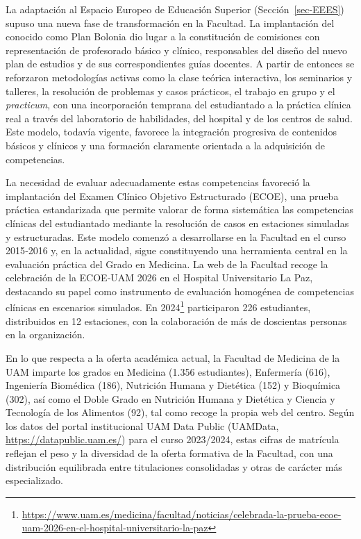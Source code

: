 \documentclass[
  11pt,
  a4paper,
  twoside]{scrreprt}
\begin{document}
La adaptación al Espacio Europeo de Educación Superior
(Sección~\ref{sec-EEES}) supuso una nueva fase de transformación en la
Facultad. La implantación del conocido como Plan Bolonia dio lugar a la
constitución de comisiones con representación de profesorado básico y
clínico, responsables del diseño del nuevo plan de estudios y de sus
correspondientes guías docentes. A partir de entonces se reforzaron
metodologías activas como la clase teórica interactiva, los seminarios y
talleres, la resolución de problemas y casos prácticos, el trabajo en
grupo y el \emph{practicum}, con una incorporación temprana del
estudiantado a la práctica clínica real a través del laboratorio de
habilidades, del hospital y de los centros de salud. Este modelo,
todavía vigente, favorece la integración progresiva de contenidos
básicos y clínicos y una formación claramente orientada a la adquisición
de competencias.

La necesidad de evaluar adecuadamente estas competencias favoreció la
implantación del Examen Clínico Objetivo Estructurado (ECOE), una prueba
práctica estandarizada que permite valorar de forma sistemática las
competencias clínicas del estudiantado mediante la resolución de casos
en estaciones simuladas y estructuradas. Este modelo comenzó a
desarrollarse en la Facultad en el curso 2015‑2016 y, en la actualidad,
sigue constituyendo una herramienta central en la evaluación práctica
del Grado en Medicina. La web de la Facultad recoge la celebración de la
ECOE‑UAM 2026 en el Hospital Universitario La Paz, destacando su papel
como instrumento de evaluación homogénea de competencias clínicas en
escenarios simulados. En 2024\footnote{\url{https://www.uam.es/medicina/facultad/noticias/celebrada-la-prueba-ecoe-uam-2026-en-el-hospital-universitario-la-paz}}
participaron 226 estudiantes, distribuidos en 12 estaciones, con la
colaboración de más de doscientas personas en la organización.

En lo que respecta a la oferta académica actual, la Facultad de Medicina
de la UAM imparte los grados en Medicina (1.356 estudiantes), Enfermería
(616), Ingeniería Biomédica (186), Nutrición Humana y Dietética (152) y
Bioquímica (302), así como el Doble Grado en Nutrición Humana y
Dietética y Ciencia y Tecnología de los Alimentos (92), tal como recoge
la propia web del centro. Según los datos del portal institucional UAM
Data Public (UAMData, \url{https://datapublic.uam.es/}) para el curso
2023/2024, estas cifras de matrícula reflejan el peso y la diversidad de
la oferta formativa de la Facultad, con una distribución equilibrada
entre titulaciones consolidadas y otras de carácter más especializado.
\end{document}
